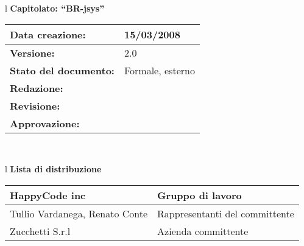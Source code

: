 

\newcommand{\lv}{ 2.0 } %
\newcommand{\dt}{ Modifiche ai documenti }%
\newcommand{\Grammatica}{} %

\begin{center}
\thispagestyle{plain}
\begin{table}[htbp]
\large{
\begin{tabular}{l}
\Large{\textbf{\textsf{Capitolato: ``BR-jsys''}}} \\
\begin{tabular}{|p{6cm}|p{6cm}|} \hline
\textbf{Data creazione:} & 15/03/2008 \\ \hline
\textbf{Versione:} & \lv \\ \hline
\textbf{Stato del documento:} & Formale, esterno \\ \hline
\textbf{Redazione:} &  \MT \\ \hline
\textbf{Revisione:} & \FC \\ \hline
\textbf{Approvazione:} & \MM \\ \hline
\end{tabular} \\
\end{tabular}
}
\end{table}

\begin{table}[hbtp]
\large{
\begin{tabular}{l}
\Large{\textbf{\textsf{Lista di distribuzione}}} \\

\begin{tabular}{|p{6cm}|p{6cm}|} \hline
{HappyCode inc}& Gruppo di lavoro\\ \hline
{Tullio Vardanega, Renato Conte}& Rappresentanti del committente \\ \hline
{Zucchetti S.r.l}& Azienda committente\\ \hline
\end{tabular} \\
\end{tabular}
}
\end{table}
\begin{table}[hbtp]


\end{table}
\end{center}
